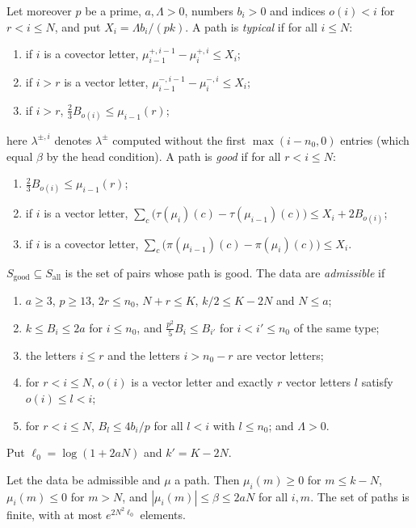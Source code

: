 \begin{definition}
Let moreover $p$ be a prime, $a,\Lambda>0$, numbers $b_i>0$ and indices $o(i)<i$ for $r<i\le N$, and put
$X_i=\Lambda b_i/(pk)$. A path is \emph{typical} if for all $i\le N$:
\begin{enumerate}[label=(T\arabic*)]
\item if $i$ is a covector letter, $\mu_{i-1}^{+,i-1}-\mu_i^{+,i}\le X_i$;
\item if $i>r$ is a vector letter, $\mu_{i-1}^{-,i-1}-\mu_i^{-,i}\le X_i$;
\item if $i>r$, $\frac23B_{o(i)}\le\mu_{i-1}(r)$;
\end{enumerate}
here $\lambda^{\pm,i}$ denotes $\lambda^{\pm}$ computed without the first $\max(i-n_0,0)$ entries (which equal $\beta$ by the head
condition). A path is \emph{good} if for all $r<i\le N$:
\begin{enumerate}[label=(G\arabic*)]
\item $\frac23B_{o(i)}\le\mu_{i-1}(r)$;
\item if $i$ is a vector letter, $\sum_c\bigl(\tau(\mu_i)(c)-\tau(\mu_{i-1})(c)\bigr)\le X_i+2B_{o(i)}$;
\item if $i$ is a covector letter, $\sum_c\bigl(\pi(\mu_{i-1})(c)-\pi(\mu_i)(c)\bigr)\le X_i$.
\end{enumerate}
$S_{\mathrm{good}}\subseteq S_{\mathrm{all}}$ is the set of pairs whose path is good. The data are \emph{admissible} if
\begin{enumerate}[label=(A\arabic*)]
\item $a\ge3$, $p\ge13$, $2r\le n_0$, $N+r\le K$, $k/2\le K-2N$ and $N\le a$;
\item $k\le B_i\le2a$ for $i\le n_0$, and $\frac{p^2}5B_i\le B_{i'}$ for $i<i'\le n_0$ of the same type;
\item the letters $i\le r$ and the letters $i>n_0-r$ are vector letters;
\item for $r<i\le N$, $o(i)$ is a vector letter and exactly $r$ vector letters $l$ satisfy $o(i)\le l<i$;
\item for $r<i\le N$, $B_l\le4b_i/p$ for all $l<i$ with $l\le n_0$; and $\Lambda>0$.
\end{enumerate}
Put $\ell_0=\log(1+2aN)$ and $k'=K-2N$.
\end{definition}

\begin{lemma}\label{pf:linkG:pathcount}
Let the data be admissible and $\mu$ a path. Then $\mu_i(m)\ge0$ for $m\le k-N$, $\mu_i(m)\le0$ for $m>N$, and
$|\mu_i(m)|\le\beta\le2aN$ for all $i,m$. The set of paths is finite, with at most $e^{2N^2\ell_0}$ elements.
\end{lemma}

